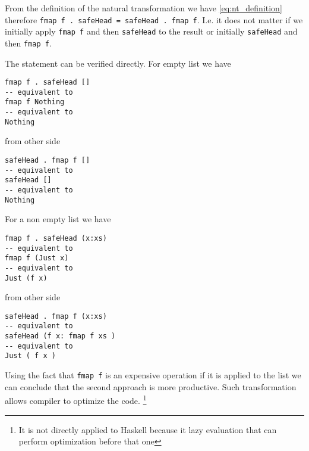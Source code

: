 \begin{example}
From the definition of the natural transformation we have
\eqref{eq:nt_definition} therefore
\texttt{fmap f . safeHead = safeHead . fmap f}. I.e. it
does not matter if we initially apply \texttt{fmap f} and
then \texttt{safeHead} to the result or initially
\texttt{safeHead} and then \texttt{fmap f}.

The statement can be verified directly. For empty list we have
\begin{verbatim}
fmap f . safeHead []
-- equivalent to
fmap f Nothing 
-- equivalent to
Nothing
\end{verbatim}
from other side
\begin{verbatim}
safeHead . fmap f []
-- equivalent to
safeHead [] 
-- equivalent to
Nothing
\end{verbatim}

For a non empty list we have
\begin{verbatim}
fmap f . safeHead (x:xs)
-- equivalent to
fmap f (Just x) 
-- equivalent to
Just (f x)
\end{verbatim}
from other side
\begin{verbatim}
safeHead . fmap f (x:xs)
-- equivalent to
safeHead (f x: fmap f xs ) 
-- equivalent to
Just ( f x )
\end{verbatim}

Using the fact that \texttt{fmap f} is an expensive
operation if it is applied to the list we can conclude that the second
approach is more productive. Such transformation allows compiler to
optimize the code.
\footnote{It is not directly applied to Haskell because it lazy
  evaluation that can perform optimization before that one}
\end{example}
